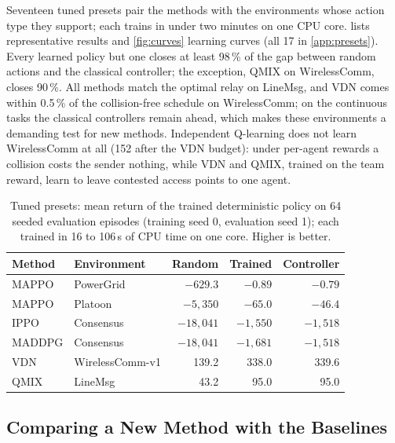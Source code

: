 \documentclass{article}
\begin{document}
Seventeen tuned presets pair the methods with the environments whose action
type they support; each trains in under two minutes on one CPU core.
 lists representative results and \cref{fig:curves} learning
curves (all 17 in \cref{app:presets}). Every learned policy but one closes at
least 98\,\% of the gap between random actions and the classical controller;
the exception, QMIX on WirelessComm, closes 90\,\%. All methods match the optimal relay on
LineMsg, and VDN comes within 0.5\,\% of the collision-free schedule on
WirelessComm; on the continuous tasks the classical controllers remain
ahead, which makes these environments a demanding test for new methods.
Independent Q-learning does not learn WirelessComm at all (152 after the VDN
budget): under per-agent rewards a collision costs the sender nothing, while
VDN and QMIX, trained on the team reward, learn to leave contested access
points to one agent.

\begin{table}[t]
  \caption{Tuned presets: mean return of the trained deterministic policy on
    64 seeded evaluation episodes (training seed 0, evaluation seed 1); each
    trained in 16 to 106\,s of CPU time on one core. Higher is better.}
  \label{tab:marl}
  \centering\footnotesize
  \setlength{\tabcolsep}{3pt}
  \begin{tabular}{@{}llrrr@{}}
    \toprule
    Method & Environment & Random & Trained & Controller \\
    \midrule
    MAPPO & PowerGrid & $-629.3$ & $-0.89$ & $-0.79$ \\
    MAPPO & Platoon & $-5{,}350$ & $-65.0$ & $-46.4$ \\
    IPPO & Consensus & $-18{,}041$ & $-1{,}550$ & $-1{,}518$ \\
    MADDPG & Consensus & $-18{,}041$ & $-1{,}681$ & $-1{,}518$ \\
    VDN & WirelessComm-v1 & 139.2 & 338.0 & 339.6 \\
    QMIX & LineMsg & 43.2 & 95.0 & 95.0 \\
    \bottomrule
  \end{tabular}
\end{table}



\subsection{Comparing a New Method with the Baselines}\label{sec:compare}
\end{document}
